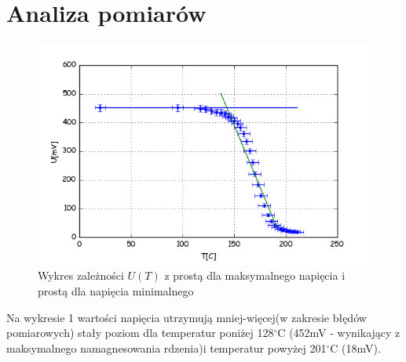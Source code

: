 \documentclass[a4paper,10pt]{article}
\begin{document}
\section{Analiza pomiarów}

\begin{figure}[H]
  \includegraphics{./Curie_proste.png}
  \caption{Wykres zależności $U(T)$ z prostą dla maksymalnego napięcia i prostą dla napięcia minimalnego}
\end{figure}

Na wykresie 1 wartości napięcia utrzymują mniej-więcej(w zakresie błędów pomiarowych) stały poziom dla temperatur poniżej 128$^\circ$C (452mV
- wynikający z maksymalnego namagnesowania rdzenia)i temperatur powyżej 201$^\circ$C (18mV). 
\end{document}
